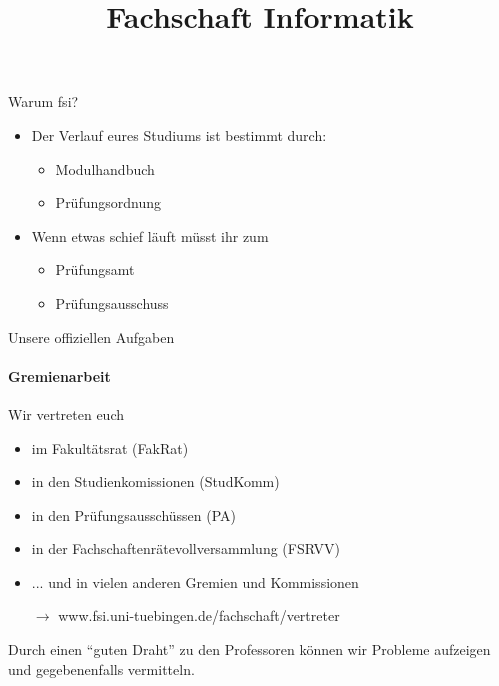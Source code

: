 \documentclass{beamer}
\title{Fachschaft Informatik}
\begin{document}
	\maketitle

	\begin{frame}{Warum fsi?}
		\begin{itemize}
			\item Der Verlauf eures Studiums ist bestimmt durch:
				\begin{itemize}
					\item Modulhandbuch
					\item Prüfungsordnung
				\end{itemize}
			\item Wenn etwas schief läuft müsst ihr zum
				\begin{itemize}
					\item Prüfungsamt
					\item Prüfungsausschuss
				\end{itemize}
		\end{itemize}
	\end{frame}

	\begin{frame}{Unsere offiziellen Aufgaben}
		\framesubtitle{Gremienarbeit}
		Wir vertreten euch
		\begin{itemize}
			\item im Fakultätsrat (FakRat)
			\item in den Studienkomissionen (StudKomm)
			\item in den Prüfungsausschüssen (PA)
			\item in der Fachschaftenrätevollversammlung (FSRVV)
			\item ... und in vielen anderen Gremien und Kommissionen
			\item[$\rightarrow$] www.fsi.uni-tuebingen.de/fachschaft/vertreter
		\end{itemize}
		Durch einen ``guten Draht'' zu den Professoren können wir Probleme aufzeigen und gegebenenfalls vermitteln.
	\end{frame}


\end{document}

